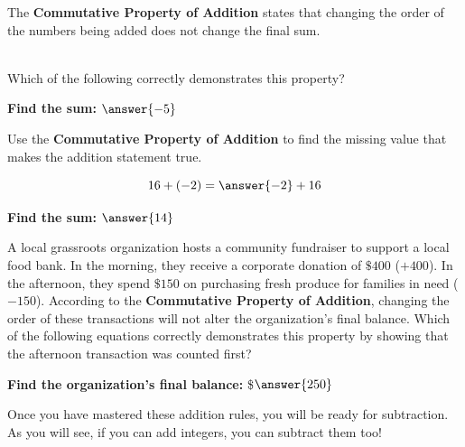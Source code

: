 \documentclass{ximera}[font=12pt]
\begin{document}
\begin{problem}
The \textbf{Commutative Property of Addition} states that changing the order of the numbers being added does not change the final sum. 

~ \\[1em]

Which of the following correctly demonstrates this property?

\begin{multipleChoice}
\end{multipleChoice}

\textcolor{accessibleOrange}{\textbf{Find the sum:}} $\answer{-5}$
\end{problem}

\begin{problem}
Use the \textbf{Commutative Property of Addition} to find the missing value that makes the addition statement true.

\[ 16 + (-2) = \answer{-2} + 16 \]

\textcolor{accessibleOrange}{\textbf{Find the sum:}} $\answer{14}$
\end{problem}


\begin{problem}
A local grassroots organization hosts a community fundraiser to support a local food bank.  In the morning, they receive a corporate donation of $\$400$ ($+400$). 
In the afternoon, they spend $\$150$ on purchasing fresh produce for families in need ($-150$).  According to the \textbf{Commutative Property of Addition}, changing 
the order of these transactions will not alter the organization's final balance.  Which of the following equations correctly demonstrates this property by showing 
that the afternoon transaction was counted first?

\begin{multipleChoice}
\end{multipleChoice}

\textcolor{accessibleOrange}{\textbf{Find the organization's final balance:}} \$$\answer{250}$ 
\end{problem}


\begin{remark}
Once you have mastered these addition rules, you will be ready for subtraction.  As you will see, 
if you can add integers, you can subtract them too!
\end{remark}
\end{document}
